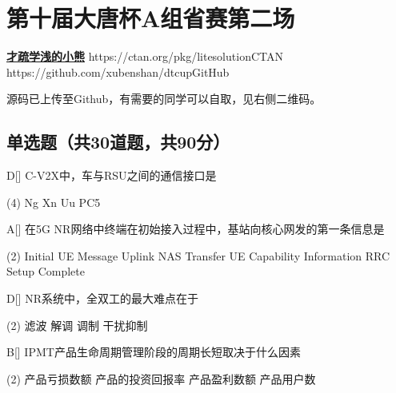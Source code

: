 \chapter{第十届大唐杯A组省赛第二场}
\fancyhead[R]{\color{H6}\kaishu\rightmark\,}

\date{2023年4月15日}{}{\href{https://qm.qq.com/q/UPbGudx8cK}{\textbf{才疏学浅的小熊}}}
{}
{https://ctan.org/pkg/litesolution}{CTAN}
{https://github.com/xubenshan/dtcup}{GitHub}

源码已上传至Github，有需要的同学可以自取，见右侧二维码。

\section{单选题（共30道题，共90分）}



\begin{choice}{D}[]
	C-V2X中，车与RSU之间的通信接口是
	\begin{tasks}(4)
		\task Ng
		\task Xn
		\task Uu
		\task PC5
	\end{tasks}
\end{choice}


\begin{choice}{A}[]
	在5G NR网络中终端在初始接入过程中，基站向核心网发的第一条信息是
	\begin{tasks}(2)
		\task Initial UE Message
		\task Uplink NAS Transfer
		\task UE Capability Information
		\task RRC Setup Complete
	\end{tasks}
\end{choice}




\begin{choice}{D}[]
	NR系统中，全双工的最大难点在于
	\begin{tasks}(2)
		\task 滤波
		\task 解调
		\task 调制
		\task 干扰抑制
	\end{tasks}
\end{choice}


\begin{choice}{B}[]
	IPMT产品生命周期管理阶段的周期长短取决于什么因素
	\begin{tasks}(2)
		\task 产品亏损数额
		\task 产品的投资回报率
		\task 产品盈利数额
		\task 产品用户数
	\end{tasks}
\end{choice}


